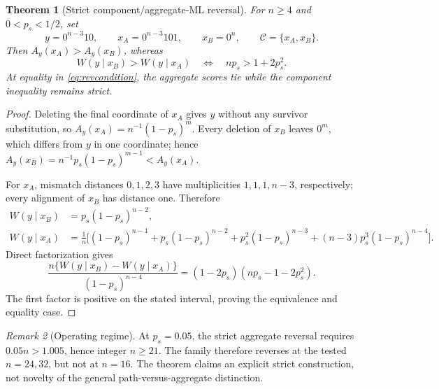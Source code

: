 \documentclass[11pt]{article}
\newtheorem{theorem}{Theorem}
\theoremstyle{remark}\newtheorem{remark}[theorem]{Remark}
\newcommand{\C}{\mathcal C}\newcommand{\I}{\mathcal I}\newcommand{\one}{\mathbf 1}
\begin{document}
\begin{theorem}[Strict component/aggregate-ML reversal]\label{thm:rev}
For $n\ge4$ and $0<p_s<1/2$, set
\[
 y=0^{n-3}10,\qquad x_A=0^{n-3}101,\qquad x_B=0^n,\qquad \C=\{x_A,x_B\}.
\]
Then $A_y(x_A)>A_y(x_B)$, whereas
\begin{equation}
 W(y\mid x_B)>W(y\mid x_A)\quad\Longleftrightarrow\quad np_s>1+2p_s^2. \label{eq:revcondition}
\end{equation}
At equality in \eqref{eq:revcondition}, the aggregate scores tie while the component inequality
remains strict.
\end{theorem}
\begin{proof}
Deleting the final coordinate of $x_A$ gives $y$ without any survivor substitution, so
$A_y(x_A)=n^{-1}(1-p_s)^m$. Every deletion of $x_B$ leaves $0^m$, which differs from $y$ in one
coordinate; hence $A_y(x_B)=n^{-1}p_s(1-p_s)^{m-1}<A_y(x_A)$.

For $x_A$, mismatch distances $0,1,2,3$ have multiplicities $1,1,1,n-3$, respectively; every
alignment of $x_B$ has distance one. Therefore
\begin{align*}
 W(y\mid x_B)&=p_s(1-p_s)^{n-2},\\
 W(y\mid x_A)&=\frac1n\bigl[(1-p_s)^{n-1}+p_s(1-p_s)^{n-2}
 +p_s^2(1-p_s)^{n-3}+(n-3)p_s^3(1-p_s)^{n-4}\bigr].
\end{align*}
Direct factorization gives
\[
 \frac{n\{W(y\mid x_B)-W(y\mid x_A)\}}{(1-p_s)^{n-4}}
 =(1-2p_s)(np_s-1-2p_s^2).
\]
The first factor is positive on the stated interval, proving the equivalence and equality case.
\end{proof}
\begin{remark}[Operating regime]
At $p_s=0.05$, the strict aggregate reversal requires $0.05n>1.005$, hence integer $n\ge21$. The
family therefore reverses at the tested $n=24,32$, but not at $n=16$. The theorem claims an explicit
strict construction, not novelty of the general path-versus-aggregate distinction.
\end{remark}
\end{document}
